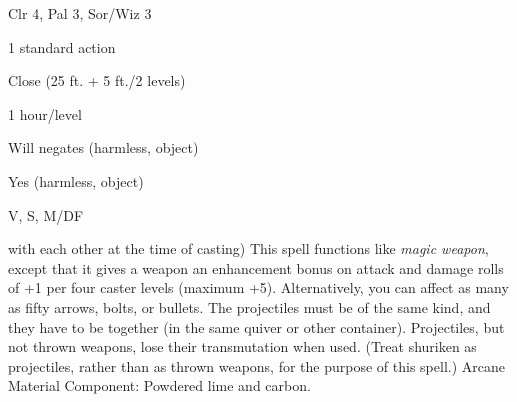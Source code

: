 
\begin{description*}
\item[Level:] Clr 4, Pal 3, Sor/Wiz 3
\item[Casting Time:] 1 standard action
\item[Range:] Close (25 ft. + 5 ft./2 levels)
\item[Duration:] 1 hour/level
\item[Saving Throw:] Will negates (harmless, object)
\item[Spell Resistance:] Yes (harmless, object)
\item[Components:] V, S, M/DF
\end{description*}

with each other at the time of casting)
This spell functions like \textit{magic weapon}, except that it gives a weapon
an enhancement bonus on attack and damage rolls of +1 per four caster levels (maximum
+5).
Alternatively, you can affect as many as fifty arrows, bolts, or bullets. The projectiles
must be of the same kind, and they have to be together (in the same quiver or other
container). Projectiles, but not thrown weapons, lose their transmutation when
used. (Treat shuriken as projectiles, rather than as thrown weapons, for the purpose
of this spell.)
Arcane Material Component: Powdered lime and carbon.